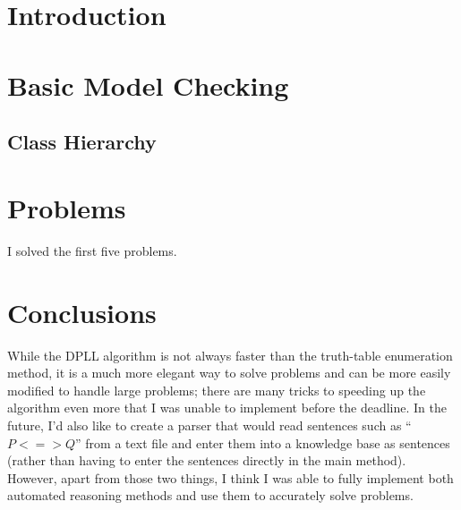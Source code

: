 \documentclass[10pt, letterpaper, oneside, headinclude, footinclude, tikz]{scrartcl}
\title{\normalfont\spacedallcaps{Uncertain Inference} \\ \normalfont\spacedallcaps{CSC 242 Project 3}}
\author{\spacedlowsmallcaps{Caroline Rodewig}}
\date{}
\begin{document}
\renewcommand{\sectionmark}[1]{\markright{\spacedlowsmallcaps{#1}}} 
\lehead{\mbox{\llap{\small\thepage\kern1em\color{halfgray} \vline}\color{halfgray}\hspace{0.5em}\rightmark\hfil}} 
\pagestyle{scrheadings}

\maketitle
\setcounter{tocdepth}{2}

\tableofcontents

\section{Introduction}

\section{Basic Model Checking}

\subsection{Class Hierarchy}

\section{Problems}
I solved the first five problems.

\section{Conclusions}
While the DPLL algorithm is not always faster than the truth-table enumeration method, it is a much more elegant way to solve problems and can be more easily modified to handle large problems; there are many tricks to speeding up the algorithm even more that I was unable to implement before the deadline. In the future, I'd also like to create a parser that would read sentences such as ``$P<=>Q$'' from a text file and enter them into a knowledge base as sentences (rather than having to enter the sentences directly in the main method). However, apart from those two things, I think I was able to fully implement both automated reasoning methods and use them to accurately solve problems.
\end{document}
